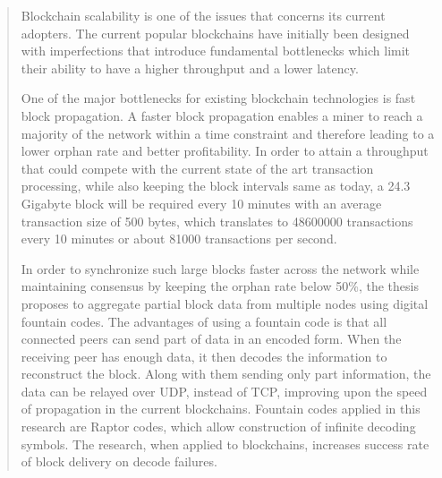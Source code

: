 \begin{abstract}

    Blockchain scalability is one of the issues that concerns its current
    adopters. The current popular blockchains have initially been designed with
    imperfections that introduce fundamental bottlenecks which limit their
    ability to have a higher throughput and a lower latency.

    One of the major bottlenecks for existing blockchain technologies is fast block
    propagation. A faster block propagation enables a miner to reach a majority
    of the network within a time constraint and therefore leading to a lower
    orphan rate and better profitability. In order to attain a throughput that
    could compete with the current state of the art transaction processing,
    while also keeping the block intervals same as today, a 24.3 Gigabyte
    block will be required every 10 minutes with an average transaction size of
    500 bytes, which translates to 48600000 transactions every 10 minutes or about 81000 transactions per second.

    In order to synchronize such large blocks faster across the network while maintaining 
    consensus by keeping the orphan rate below 50\%, the thesis
    proposes to aggregate partial block data from multiple nodes using digital
    fountain codes. The advantages of using a fountain code is that all connected peers can send
    part of data in an encoded form. When the receiving peer has enough data, it
    then decodes the information to reconstruct the block. Along with them
    sending only part information, the data can be relayed over UDP, instead of
    TCP, improving upon the speed of propagation  in the current blockchains.
    Fountain codes applied in this research are Raptor codes, which allow
    construction of infinite decoding symbols. The research, when applied to
    blockchains, increases success rate of block delivery on decode failures.
      
\end{abstract}
